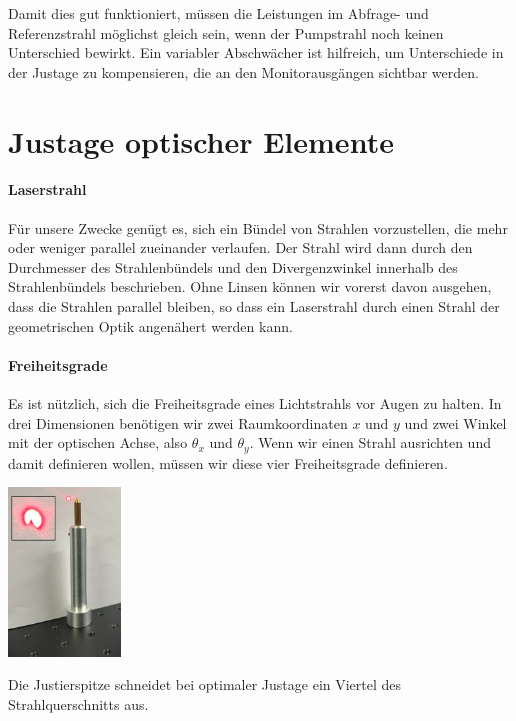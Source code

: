 Damit dies gut funktioniert, müssen die Leistungen im Abfrage- und Referenzstrahl möglichst gleich sein, wenn der Pumpstrahl noch keinen Unterschied bewirkt. Ein variabler Abschwächer ist hilfreich, um Unterschiede in der Justage zu kompensieren, die an den Monitorausgängen sichtbar werden.








\section{Justage optischer Elemente}


\paragraph*{Laserstrahl} Für unsere Zwecke genügt es, sich ein Bündel von Strahlen vorzustellen, die mehr oder weniger parallel zueinander verlaufen. Der Strahl wird dann durch den Durchmesser des Strahlenbündels und den Divergenzwinkel innerhalb des Strahlenbündels beschrieben. Ohne Linsen können wir vorerst davon ausgehen, dass die Strahlen parallel bleiben, so dass ein Laserstrahl durch einen Strahl der geometrischen Optik angenähert werden kann.

\paragraph*{Freiheitsgrade} Es ist nützlich, sich die Freiheitsgrade eines Lichtstrahls vor Augen zu halten.  In drei Dimensionen benötigen wir zwei Raumkoordinaten $x$ und $y$ und zwei Winkel mit der optischen Achse, also $\theta_x$ und $\theta_y$. Wenn wir einen Strahl ausrichten und damit definieren wollen, müssen wir diese vier Freiheitsgrade definieren.

\begin{marginfigure}
	\includegraphics*[width=30mm]{bilder/justierspitze.png}
	\caption{Die Justierspitze schneidet bei optimaler Justage ein Viertel des Strahlquerschnitts aus. }
\end{marginfigure}

